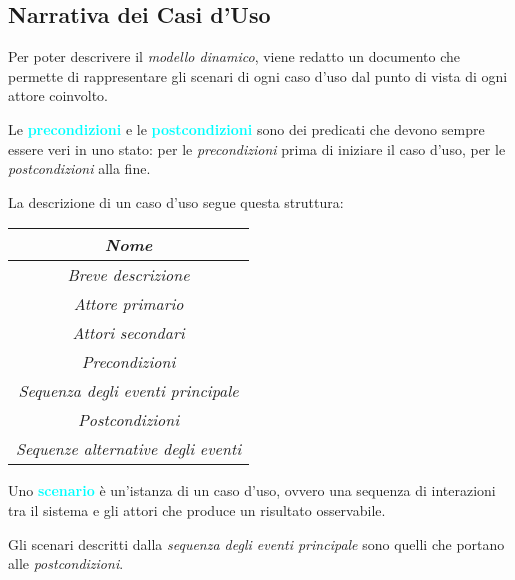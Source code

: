 \begin{figure}[h]
    \centering
\end{figure}

\subsection{Narrativa dei Casi d'Uso}
Per poter descrivere il \emph{modello dinamico}, viene redatto un documento che permette di
rappresentare gli scenari di ogni caso d'uso dal punto di vista di ogni attore coinvolto.

\begin{definition}
    Le \textbf{\textcolor{cyan}{precondizioni}} e le \textbf{\textcolor{cyan}{postcondizioni}} sono
    dei predicati che devono sempre essere veri in uno stato: per le \emph{precondizioni} prima di iniziare il caso d'uso,
    per le \emph{postcondizioni} alla fine.
\end{definition}

La descrizione di un caso d'uso segue questa struttura:

\begin{center}
    \begin{tabular}{||c||}
        \hline
        \emph{Nome} \\
        \hline
        \emph{Breve descrizione} \\
        \hline
        \emph{Attore primario} \\
        \hline
        \emph{Attori secondari} \\
        \hline
        \emph{Precondizioni} \\
        \hline
        \emph{Sequenza degli eventi principale} \\
        \hline
        \emph{Postcondizioni} \\
        \hline
        \emph{Sequenze alternative degli eventi} \\
        \hline
    \end{tabular}
\end{center}

\begin{definition}[Scenario]
    Uno \textbf{\textcolor{cyan}{scenario}} è un'istanza di un caso d'uso, ovvero una sequenza 
    di interazioni tra il sistema e gli attori che produce un risultato osservabile.

    Gli scenari descritti dalla \emph{sequenza degli eventi principale} sono quelli che portano
    alle \emph{postcondizioni}.
\end{definition}

